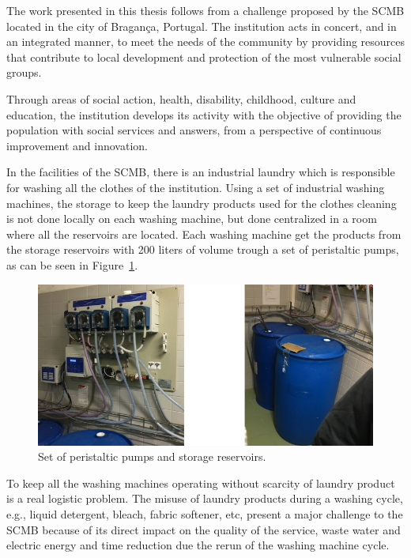 The work presented in this thesis follows from a challenge proposed by the \gls{SCMB} located in the city of Bragança, Portugal. The institution acts in concert, and in an integrated manner, to meet the needs of the community by providing resources that contribute to local development and protection of the most vulnerable social groups. 

Through areas of social action, health, disability, childhood, culture and education, the institution develops its activity with the objective of providing the population with social services and answers, from a perspective of continuous improvement and innovation.

In the facilities of the \gls{SCMB}, there is an industrial laundry which is responsible for washing all the clothes of the institution. Using a set of industrial washing machines, the storage to keep the laundry products used for the clothes cleaning is not done locally on each washing machine, but done centralized in a room where all the reservoirs are located. Each washing machine get the products from the storage reservoirs with 200 liters of volume trough a set of peristaltic pumps, as can be seen in Figure~\ref{fig:estruturaPNG}.

\begin{figure}[h!]
	\centering
	\includegraphics[scale=0.75]{etc/estrutura.png}
	\caption{Set of peristaltic pumps and storage reservoirs.}
	\label{fig:estruturaPNG}
\end{figure}

To keep all the washing machines operating without scarcity of laundry product is a real logistic problem. The misuse of laundry products during a washing cycle, e.g., liquid detergent, bleach, fabric softener, etc, present a major challenge to the \gls{SCMB} because of its direct impact on the quality of the service, waste water and electric energy and time reduction due the rerun of the washing machine cycle. 


